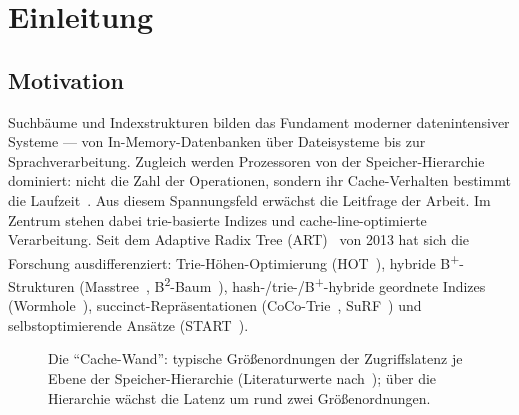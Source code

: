 \chapter{Einleitung}\label{ch:intro}


\section{Motivation}\label{sec:motivation}
Suchbäume und Indexstrukturen bilden das Fundament moderner datenintensiver Systeme --- von In-Memory-Datenbanken über
Dateisysteme bis zur Sprachverarbeitung. Zugleich werden Prozessoren von der Speicher-Hierarchie
dominiert: nicht die Zahl der Operationen, sondern ihr Cache-Verhalten bestimmt die
Laufzeit~\cite{hennessy2019architecture, drepper2007memory, wulf1995memorywall}. Aus diesem
Spannungsfeld erwächst die Leitfrage der Arbeit.
Im Zentrum stehen dabei trie-basierte Indizes und cache-line-optimierte Verarbeitung. Seit dem
Adaptive Radix Tree (ART)~\cite{leis2013art} von 2013 hat sich die Forschung ausdifferenziert:
Trie-Höhen-Optimierung (HOT~\cite{binna2018hot}), hybride B\textsuperscript{+}-Strukturen
(Masstree~\cite{mao2012masstree}, B\textsuperscript{2}-Baum~\cite{schmeisser2022b2tree}),
hash-/trie-/B\textsuperscript{+}-hybride geordnete Indizes (Wormhole~\cite{wu2019wormhole}),
succinct-Repräsentationen
(CoCo-Trie~\cite{boffa2024coco}, SuRF~\cite{zhang2018surf}) und selbstoptimierende Ansätze
(START~\cite{fent2020start}).

\begin{nurlang}
\begin{figure}[htbp]\centering
{}
\caption{Die \enquote{Cache-Wand}: typische Größenordnungen der Zugriffslatenz je Ebene der
Speicher-Hierarchie (Literaturwerte nach~\cite{hennessy2019architecture, drepper2007memory}); über die
Hierarchie wächst die Latenz um rund zwei Größenordnungen.}\label{fig:cache-wall}
\end{figure}
\end{nurlang}

